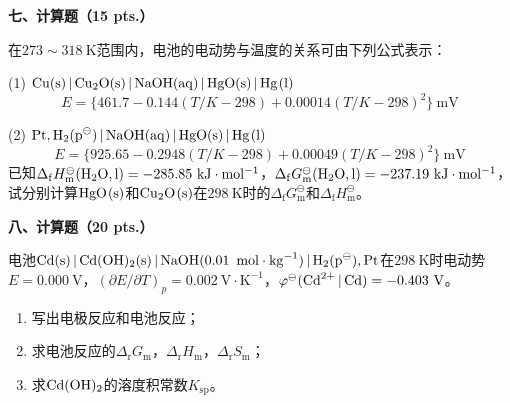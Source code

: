 \vspace{0.5cm}
\noindent\textbf{七、计算题（15 pts.）}

在$273\sim318\ \mathrm{K}$范围内，电池的电动势与温度的关系可由下列公式表示：

(1) $\ce{Cu(s) | Cu2O(s) | NaOH(aq) | HgO(s) | Hg(l)}$
\[
E = \{461.7 - 0.144(T/K - 298) + 0.00014(T/K - 298)^2\}\ \mathrm{mV}
\]

(2) $\ce{Pt, H2(p^\ominus) | NaOH(aq) | HgO(s) | Hg(l)}$
\[
E = \{925.65 - 0.2948(T/K - 298) + 0.00049(T/K - 298)^2\}\ \mathrm{mV}
\]
已知$\Delta_\mathrm{f}H_\mathrm{m}^\ominus(\ce{H2O,l})=-285.85\ \mathrm{kJ\cdot mol^{-1}}$，$\Delta_\mathrm{f}G_\mathrm{m}^\ominus(\ce{H2O,l})=-237.19\ \mathrm{kJ\cdot mol^{-1}}$，试分别计算$\ce{HgO(s)}$和$\ce{Cu2O(s)}$在$298\ \mathrm{K}$时的$\Delta_\mathrm{f}G_\mathrm{m}^\ominus$和$\Delta_\mathrm{f}H_\mathrm{m}^\ominus$。

\vspace{0.5cm}
\noindent\textbf{八、计算题（20 pts.）}

电池$\ce{Cd(s) | Cd(OH)2(s) | NaOH(0.01\ mol\cdot kg^{-1}) | H2(p^\ominus), Pt}$在$298\ \mathrm{K}$时电动势$E=0.000\ \mathrm{V}$，$(\partial E/\partial T)_p=0.002\ \mathrm{V\cdot K^{-1}}$，$\varphi^\ominus(\ce{Cd^{2+} | Cd})=-0.403\ \mathrm{V}$。
\begin{enumerate}[label=(\arabic*), itemsep=1ex]
    \item 写出电极反应和电池反应；
    \item 求电池反应的$\Delta_\mathrm{r}G_\mathrm{m}$，$\Delta_\mathrm{r}H_\mathrm{m}$，$\Delta_\mathrm{r}S_\mathrm{m}$；
    \item 求$\ce{Cd(OH)2}$的溶度积常数$K_{\mathrm{sp}}$。
\end{enumerate}